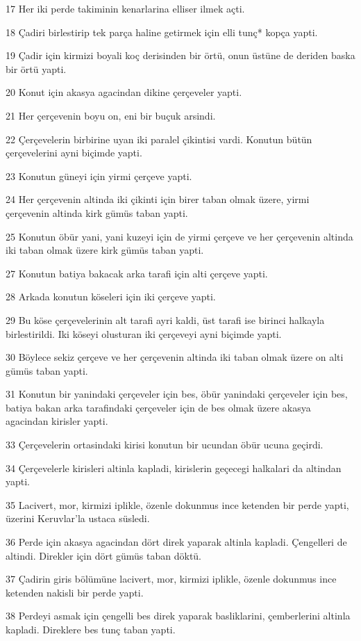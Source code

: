 \par 17 Her iki perde takiminin kenarlarina elliser ilmek açti.
\par 18 Çadiri birlestirip tek parça haline getirmek için elli tunç* kopça yapti.
\par 19 Çadir için kirmizi boyali koç derisinden bir örtü, onun üstüne de deriden baska bir örtü yapti.
\par 20 Konut için akasya agacindan dikine çerçeveler yapti.
\par 21 Her çerçevenin boyu on, eni bir buçuk arsindi.
\par 22 Çerçevelerin birbirine uyan iki paralel çikintisi vardi. Konutun bütün çerçevelerini ayni biçimde yapti.
\par 23 Konutun güneyi için yirmi çerçeve yapti.
\par 24 Her çerçevenin altinda iki çikinti için birer taban olmak üzere, yirmi çerçevenin altinda kirk gümüs taban yapti.
\par 25 Konutun öbür yani, yani kuzeyi için de yirmi çerçeve ve her çerçevenin altinda iki taban olmak üzere kirk gümüs taban yapti.
\par 27 Konutun batiya bakacak arka tarafi için alti çerçeve yapti.
\par 28 Arkada konutun köseleri için iki çerçeve yapti.
\par 29 Bu köse çerçevelerinin alt tarafi ayri kaldi, üst tarafi ise birinci halkayla birlestirildi. Iki köseyi olusturan iki çerçeveyi ayni biçimde yapti.
\par 30 Böylece sekiz çerçeve ve her çerçevenin altinda iki taban olmak üzere on alti gümüs taban yapti.
\par 31 Konutun bir yanindaki çerçeveler için bes, öbür yanindaki çerçeveler için bes, batiya bakan arka tarafindaki çerçeveler için de bes olmak üzere akasya agacindan kirisler yapti.
\par 33 Çerçevelerin ortasindaki kirisi konutun bir ucundan öbür ucuna geçirdi.
\par 34 Çerçevelerle kirisleri altinla kapladi, kirislerin geçecegi halkalari da altindan yapti.
\par 35 Lacivert, mor, kirmizi iplikle, özenle dokunmus ince ketenden bir perde yapti, üzerini Keruvlar'la ustaca süsledi.
\par 36 Perde için akasya agacindan dört direk yaparak altinla kapladi. Çengelleri de altindi. Direkler için dört gümüs taban döktü.
\par 37 Çadirin giris bölümüne lacivert, mor, kirmizi iplikle, özenle dokunmus ince ketenden nakisli bir perde yapti.
\par 38 Perdeyi asmak için çengelli bes direk yaparak basliklarini, çemberlerini altinla kapladi. Direklere bes tunç taban yapti.

